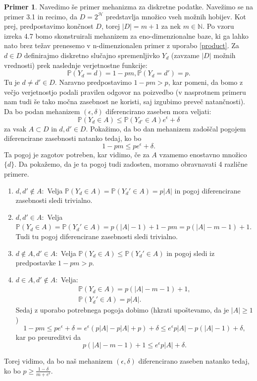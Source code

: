 \documentclass[12pt,a4paper]{amsart}
\theoremstyle{definition} %
\newtheorem{primer}[definicija]{Primer}
\theoremstyle{plain} %
\begin{document}
\begin{primer}
Navedimo še primer mehanizma za diskretne podatke. Navežimo se na primer 3.1 in recimo, da $D=2^{\mathcal{H}}$ predstavlja množico vseh možnih hobijev. Kot prej, predpostavimo končnost $D$, torej $|D| = m + 1$ za nek $m \in \mathbb{N}$. Po vzoru izreka 4.7 bomo skonstruirali mehanizem za eno-dimenzionalne baze, ki ga lahko nato brez težav prenesemo v n-dimenzionalen primer z uporabo \eqref{product}.
\newline
\newline
Za $d \in D$ definirajmo diskretno slučajno spremenljivko $Y_d$ (zavzame $|D|$ možnih vrednosti) prek naslednje verjetnostne funkcije:
$$\mathbb{P}(Y_d=d) = 1 - pm, \mathbb{P}(Y_d=d') = p.$$
Tu je $d \neq d' \in D$. Naravno predpostavimo $1 - pm > p$, kar pomeni, da bomo z večjo verjetnostjo podali pravilen odgovor na poizvedbo (v nasprotnem primeru nam tudi še tako močna zasebnost ne koristi, saj izgubimo preveč natančnosti).
\newline
\newline
Da bo podan mehanizem $(\epsilon, \delta)$ diferencirano zaseben mora veljati:
\begin{equation}
\mathbb{P}(Y_d \in A) \leq \mathbb{P}(Y_{d'} \in A)e^{\epsilon} + \delta
\end{equation}
za vsak $A \subset D$ in $d, d' \in D$.
\newline
\newline
Pokažimo, da bo dan mehanizem zadoščal pogojem diferencirane zasebnosti natanko tedaj, ko bo $$1 - pm \leq pe^{\epsilon} + \delta.$$ Ta pogoj je zagotov potreben, kar vidimo, če za $A$ vzamemo enostavno množico $\{d\}$. Da pokažemo, da je ta pogoj tudi zadosten, moramo obravnavati 4 različne primere.
\begin{enumerate}
\item $d,d' \notin A: $ Velja $\mathbb{P}(Y_d \in A) = \mathbb{P}(Y_d' \in A)= p|A|$ in pogoj diferencirane zasebnosti sledi trivialno.
\item $d,d' \in A: $ Velja $\mathbb{P}(Y_d \in A) = \mathbb{P}(Y_d' \in A) = p(|A| - 1) + 1 - pm=p(|A| -m -1) + 1$. Tudi tu pogoj diferencirane zasebnosti sledi trivialno.
\item $d \notin A,d' \in A: $ Velja $\mathbb{P}(Y_d \in A) \leq \mathbb{P}(Y_d' \in A)$ in pogoj sledi iz predpostavke $1 - pm > p$.
\item  $d \in A, d' \notin A: $ Velja:
\begin{equation*}
\begin{split}
\mathbb{P}(Y_d \in A) = p(|A| -m -1) + 1, \\
\mathbb{P}(Y_d' \in A) = p|A|.
\end{split}
\end{equation*}
Sedaj z uporabo potrebnega pogoja dobimo (hkrati upoštevamo, da je $|A| \geq 1$)
$$1-pm\leq pe^{\epsilon} + \delta = e^{\epsilon}(p|A|-p|A|+p)+\delta \leq e^{\epsilon}p|A|-p(|A|-1)+\delta,$$
kar po preureditvi da 
$$p(|A| -m -1) + 1 \leq e^{\epsilon}p|A| + \delta.$$
\end{enumerate}
Torej vidimo, da bo naš mehanizem $(\epsilon, \delta)$ diferencirano zaseben natanko tedaj, ko bo $p \geq \frac{1-\delta}{m+e^{\epsilon}}$.


\end{primer}
\end{document}
